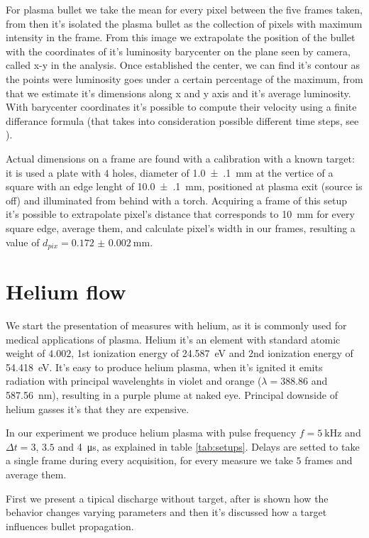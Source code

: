 For plasma bullet we take the mean for every pixel between the five frames taken, from then it's isolated the plasma bullet as the collection of pixels with maximum intensity in the frame. From this image we extrapolate the position of the bullet with the coordinates of it's luminosity barycenter on the plane seen by camera, called x-y in the analysis.
Once established the center, we can find it's contour as the points were luminosity goes under a certain percentage of the maximum, from that we estimate it's dimensions along x and y axis and it's average luminosity.
With barycenter coordinates it's possible to compute their velocity using a finite differance formula (that takes into consideration possible different time steps, see \cite{Bhadauria}).


Actual dimensions on a frame are found with a calibration with a known target: it is used a plate with $4$ holes, diameter of \SI{1.0(1)}{\milli\meter} at the vertice of a square with an edge lenght of \SI{10.0(1)}{\milli\meter}, positioned at plasma exit (source is off) and illuminated from behind with a torch.
Acquiring a frame of this setup it's possible to extrapolate pixel's distance that corresponds to \SI{10}{\milli\meter} for every square edge, average them, and calculate pixel's width in our frames, resulting a value of $d_{pix} = \SI{0.172(2)}{\milli\meter}$.

\section{Helium flow}
We start the presentation of measures with helium, as it is commonly used for medical applications of plasma.
Helium it's an element with standard atomic weight of $\num{4.002}$, 1st ionization energy of \SI{24.587}{\electronvolt} and 2nd ionization energy of \SI{54.418}{\electronvolt}.
It's easy to produce helium plasma, when it's ignited it emits radiation with principal wavelenghts in violet and orange ($\lambda = \num{388.86}$ and \SI{587.56}{\nano\meter}), resulting in a purple plume at naked eye.
Principal downside of helium gasses it's that they are expensive.


In our experiment we produce helium plasma with pulse frequency $f = \SI{5}{\kilo\hertz}$ and $\Delta t = \num{3}$, $\num{3.5}$ and \SI{4}{\micro\second}, as explained in table \ref{tab:setups}.
Delays are setted to take a single frame during every acquisition, for every measure we take $5$ frames and average them.


First we present a tipical discharge without target, after is shown how the behavior changes varying parameters and then it's discussed how a target influences bullet propagation.


